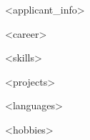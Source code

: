 \documentclass[12pt]{article}
\begin{document}

    \begin{center}
    {
        \small\bodyfont
        <applicant_info>
    }
    \end{center}


    \setlength{\parskip}{\baselineskip}
    \setlength{\parindent}{2pt}

<career>

<skills>

<projects>

<languages>

<hobbies>
\end{document}
